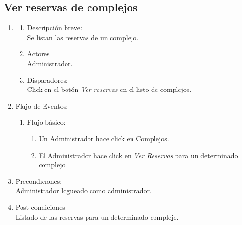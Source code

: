 \documentclass[a4paper,11pt]{article}
\begin{document}
\subsection{Ver reservas de complejos}
\begin{enumerate}

    \item
    \begin{enumerate}
    \item Descripción breve: \\
        Se listan las reservas de un complejo.
    \item Actores \\
        Administrador.
    \item Disparadores: \\
        Click en el botón \emph{Ver reservas}
        en el listo de complejos.
    \end{enumerate}

    \item Flujo de Eventos:

    \begin{enumerate}

        \item Flujo básico:
	\begin{enumerate}
            \item Un Administrador hace click en \underline{Complejos}.
	    \item El Administrador hace click en \emph{Ver Reservas} para un determinado complejo.
        \end{enumerate}

    \end{enumerate}

    \item Precondiciones: \\
        Administrador logueado como administrador.

    \item Post condiciones \\
        Listado de las reservas para un determinado complejo.

\end{enumerate}

\end{document}
